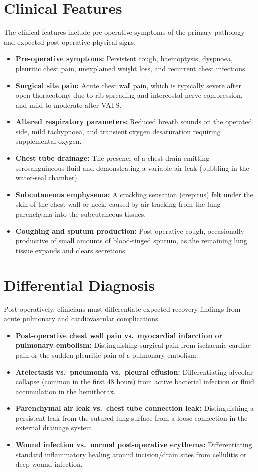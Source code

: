 \section*{Clinical Features}
The clinical features include pre-operative symptoms of the primary pathology and expected post-operative physical signs.
\begin{itemize}
    \item \textbf{Pre-operative symptoms:} Persistent cough, haemoptysis, dyspnoea, pleuritic chest pain, unexplained weight loss, and recurrent chest infections.
    \item \textbf{Surgical site pain:} Acute chest wall pain, which is typically severe after open thoracotomy due to rib spreading and intercostal nerve compression, and mild-to-moderate after VATS.
    \item \textbf{Altered respiratory parameters:} Reduced breath sounds on the operated side, mild tachypnoea, and transient oxygen desaturation requiring supplemental oxygen.
    \item \textbf{Chest tube drainage:} The presence of a chest drain emitting serosanguineous fluid and demonstrating a variable air leak (bubbling in the water-seal chamber).
    \item \textbf{Subcutaneous emphysema:} A crackling sensation (crepitus) felt under the skin of the chest wall or neck, caused by air tracking from the lung parenchyma into the subcutaneous tissues.
    \item \textbf{Coughing and sputum production:} Post-operative cough, occasionally productive of small amounts of blood-tinged sputum, as the remaining lung tissue expands and clears secretions.
\end{itemize}

\section*{Differential Diagnosis}
Post-operatively, clinicians must differentiate expected recovery findings from acute pulmonary and cardiovascular complications.
\begin{itemize}
    \item \textbf{Post-operative chest wall pain vs.\ myocardial infarction or pulmonary embolism:} Distinguishing surgical pain from ischaemic cardiac pain or the sudden pleuritic pain of a pulmonary embolism.
    \item \textbf{Atelectasis vs.\ pneumonia vs.\ pleural effusion:} Differentiating alveolar collapse (common in the first 48 hours) from active bacterial infection or fluid accumulation in the hemithorax.
    \item \textbf{Parenchymal air leak vs.\ chest tube connection leak:} Distinguishing a persistent leak from the sutured lung surface from a loose connection in the external drainage system.
    \item \textbf{Wound infection vs.\ normal post-operative erythema:} Differentiating standard inflammatory healing around incision/drain sites from cellulitis or deep wound infection.
\end{itemize}

